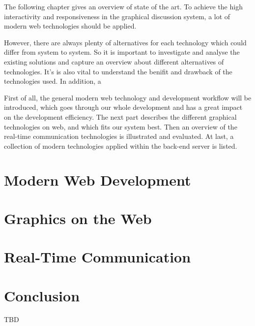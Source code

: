 The following chapter gives an overview of state of the art. To achieve the high interactivity and responsiveness in the graphical discussion system, a lot of modern web technologies should be applied.

However, there are always plenty of alternatives for each technology which could differ from system to system. So it is important to investigate and analyse the existing solutions and capture an overview about different alternatives of technologies. It's is also vital to understand the benifit and drawback of the technologies used. In addition, a

First of all, the general modern web technology and development workflow will be introduced, which goes through our whole development and has a great impact on the development efficiency. The next part describes the different graphical technologies on web, and which fits our system best. Then an overview of the real-time communication technologies is illustrated and evaluated. At last, a collection of modern technologies applied within the back-end server is listed.

\section{Modern Web Development}

\section{Graphics on the Web}
 \label{graphics-section}
\section{Real-Time Communication}

% 
% 


\section{Conclusion}

TBD
